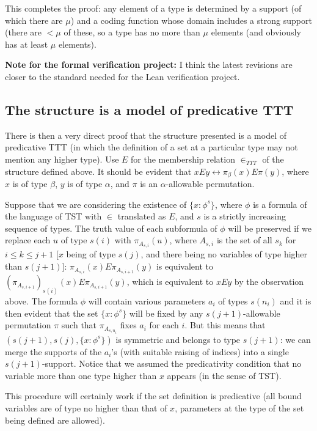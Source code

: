 \documentclass[112pt]{article}
\begin{document}
This completes the proof:  any element of a type is determined by a support (of which there are $\mu$) and a coding function whose domain includes a strong support (there are $<\mu$ of these, so a type has no more than $\mu$ elements (and obviously has at least $\mu$ elements).


{\bf Note for the formal verification project:}  I think the latest revisions are closer to the standard needed for the Lean verification project.
\newpage
\subsection{The structure is a model of predicative TTT}

There is then a very direct proof that the structure presented is a model of predicative TTT (in which the definition of a set at a particular type may not mention any higher type).  Use $E$ for the membership relation $\in_{TTT}$ of the structure defined above.  It should be evident that $x E y \leftrightarrow \pi_\beta(x) E \pi(y)$,
where $x$ is of type $\beta$, $y$ is of type $\alpha$, and $\pi$ is an $\alpha$-allowable permutation.

Suppose that we are considering the existence of $\{x : \phi^s\}$, where $\phi$ is a formula of the language of TST with $\in$ translated as $E$, and $s$ is a strictly increasing sequence of types.  The truth value of each subformula of $\phi$ will be preserved if we replace each $u$ of type $s(i)$ with $\pi_{A_{s,i}}(u)$, where  $A_{s,i}$ is the set of all $s_k$ for $i \leq k \leq j+1$ [$x$ being of type $s(j)$, and there being no variables of type higher than $s(j+1)$]:  $\pi_{A_{s,i}}(x) E  \pi_{A_{s,i+1}}(y)$ is equivalent to $(\pi_{A_{s,i+1}})_{s(i)}(x) E \pi_{A_{s,i+1}}(y)$, which is equivalent to $xEy$ by the observation above. The formula $\phi$ will contain various parameters $a_i$ of types $s(n_i)$ and it is then evident that the set $\{x : \phi^s\}$ will be fixed by any $s(j+1)$-allowable permutation $\pi$ such that $\pi_{A_{s,n_i}}$ fixes $a_i$ for each $i$.  But this means that
$(s(j+1),s(j),\{x : \phi^s\})$ is symmetric and belongs to type $s(j+1)$:  we can merge the supports of the $a_i$'s (with suitable raising of indices) into a single $s(j+1)$-support.  Notice that we assumed the predicativity condition that no variable more than one type higher than $x$ appears (in the sense of TST).

This procedure will certainly work if the set definition is predicative (all bound variables are of type no higher than that of $x$, parameters at the type
of the set being defined are allowed).
\end{document}
